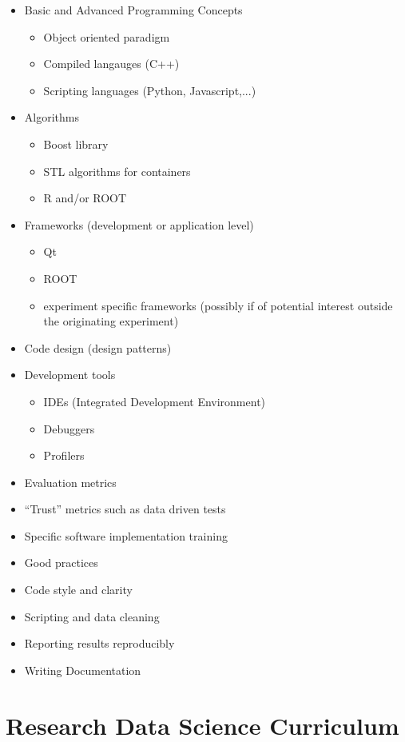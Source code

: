 \documentclass[12pt,a4paper]{article}
\begin{document}
\begin{appendices}
\begin{itemize}
   \item Basic and Advanced Programming Concepts
   \begin{itemize}
      \item Object oriented paradigm
      \item Compiled langauges (C++)
      \item Scripting languages (Python, Javascript,...)
   \end{itemize}
   \item Algorithms
   \begin{itemize}
      \item Boost library
      \item STL algorithms for containers
      \item R and/or ROOT
   \end{itemize}
   \item Frameworks (development or application level)
   \begin{itemize}
      \item Qt
      \item ROOT
      \item experiment specific frameworks (possibly if of potential interest outside the originating experiment)
   \end{itemize}
   \item Code design (design patterns)
   \item Development tools
   \begin{itemize}
      \item IDEs (Integrated Development Environment)
      \item Debuggers
      \item Profilers
   \end{itemize}
   \item Evaluation metrics
   \item “Trust” metrics such as data driven tests
   \item Specific software implementation training
   \item Good practices
   \item Code style and clarity
   \item Scripting and data cleaning
   \item Reporting results reproducibly
   \item Writing Documentation
\end{itemize}


\hypertarget{appendix-b}{%
\section{Research Data Science Curriculum}\label{appendix-b}}


\end{appendices}
\end{document}
